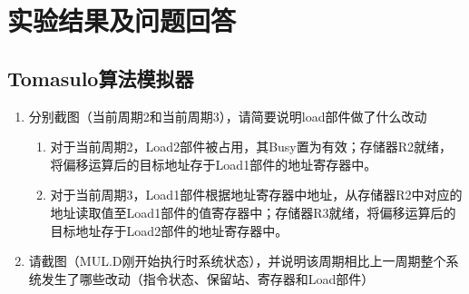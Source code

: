 \documentclass[UTF8]{article}
\begin{document}
    \section{实验结果及问题回答}
    \subsection{Tomasulo算法模拟器}
    \begin{enumerate}
        \item 分别截图（当前周期2和当前周期3），请简要说明load部件做了什么改动
        \begin{figure}[H]
            \centering
        \end{figure}
        \begin{enumerate}
            \item 对于当前周期2，Load2部件被占用，其Busy置为有效；存储器R2就绪，将偏移运算后的目标地址存于Load1部件的地址寄存器中。
            \item 对于当前周期3，Load1部件根据地址寄存器中地址，从存储器R2中对应的地址读取值至Load1部件的值寄存器中；存储器R3就绪，将偏移运算后的目标地址存于Load2部件的地址寄存器中。
        \end{enumerate}
        \item 请截图（MUL.D刚开始执行时系统状态），并说明该周期相比上一周期整个系统发生了哪些改动（指令状态、保留站、寄存器和Load部件）
        \begin{figure}[H]
            \centering
\end{figure}
\end{enumerate}
\end{document}
